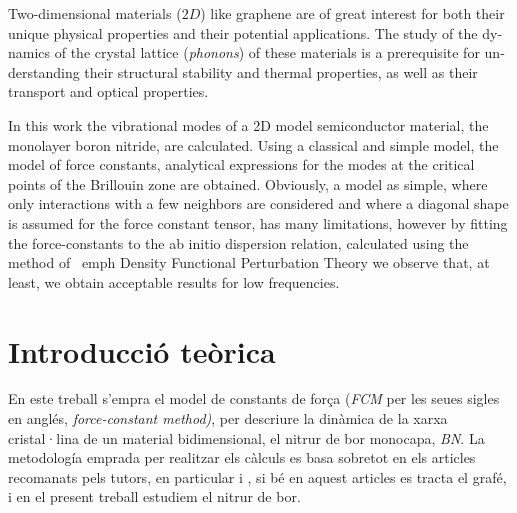 \documentclass[12pt]{article} %
\begin{document}
\vspace{\baselineskip}

\begin{otherlanguage}{english}\itshape

Two-dimensional materials ($2D$) like graphene are of great interest for both their unique physical properties and their potential applications. The study of the dynamics of the crystal lattice (\textit {phonons}) of these materials is a prerequisite for understanding their structural stability and thermal properties, as well as their transport and optical properties.
 
 In this work the vibrational modes of a 2D model semiconductor material, the monolayer boron nitride, are calculated. Using a classical and simple model, the model of force constants, analytical expressions for the modes at the critical points of the Brillouin zone are obtained. Obviously, a model as simple, where only interactions with a few neighbors are considered and where a diagonal shape is assumed for the force constant tensor, has many limitations, however by fitting the force-constants to the ab initio  dispersion relation, calculated using the method of \ emph {Density Functional Perturbation Theory} we observe that, at least, we obtain acceptable results for low frequencies.

\noindent 

\end{otherlanguage}



\section{Introducció teòrica}

En este treball s'empra el model de constants de força (\emph{FCM} per les seues sigles en anglés, \emph{\foreignlanguage{english}{force-constant method})}, per descriure la dinàmica de la xarxa cristal·lina de un material bidimensional, el nitrur de bor monocapa, \emph{BN}. La metodología emprada per realitzar els càlculs es basa sobretot en els articles recomanats pels tutors, en particular \cite{wirtz04_phonon_disper_graph_revis} i \cite{falkovsky08_symmet_const_phonon_disper_graph}, si bé en aquest articles es tracta el grafé, i en el present treball estudiem el nitrur de bor.
\end{document}
